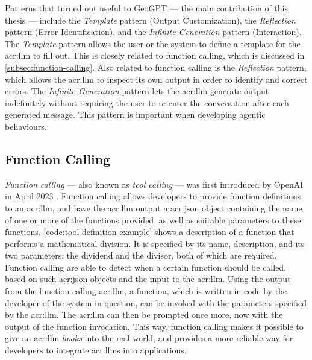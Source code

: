 Patterns that turned out useful to GeoGPT --- the main contribution of this thesis --- include the \textit{Template} pattern (Output Customization), the \textit{Reflection} pattern (Error Identification), and the \textit{Infinite Generation} pattern (Interaction). The \textit{Template} pattern allows the user or the system to define a template for the \acrshort{acr:llm} to fill out. This is closely related to function calling, which is discussed in \autoref{subsec:function-calling}. Also related to function calling is the \textit{Reflection} pattern, which allows the \acrshort{acr:llm} to inspect its own output in order to identify and correct errors. The \textit{Infinite Generation} pattern lets the \acrshort{acr:llm} generate output indefinitely without requiring the user to re-enter the conversation after each generated message. This pattern is important when developing agentic behaviours.


\subsection[Function Calling LLMs]{Function Calling }
\label{subsec:function-calling}

\textit{Function calling} --- also known as \textit{tool calling} --- was first introduced by OpenAI in April 2023 \citep{eletiFunctionCallingOther2023}. Function calling allows developers to provide function definitions to an \gls{acr:llm}, and have the \gls{acr:llm} output a \acrshort{acr:json} object containing the name of one or more of the functions provided, as well as suitable parameters to these functions. \autoref{code:tool-definition-example} shows a description of a function that performs a mathematical division. It is specified by its name, description, and its two parameters: the dividend and the divisor, both of which are required. Function calling  are able to detect when a certain function should be called, based on such \acrshort{acr:json} objects and the input to the \acrshort{acr:llm}. Using the output from the function calling \acrshort{acr:llm}, a function, which is written in code by the developer of the system in question, can be invoked with the parameters specified by the \acrshort{acr:llm}. The \acrshort{acr:llm} can then be prompted once more, now with the output of the function invocation.  This way, function calling makes it possible to give an \gls{acr:llm} \textit{hooks} into the real world, and provides a more reliable way for developers to integrate \glspl{acr:llm} into applications.

